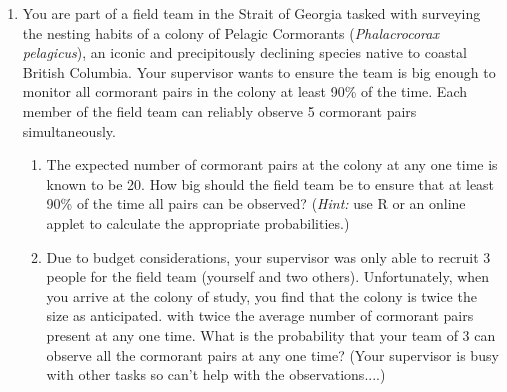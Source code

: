 \documentclass[11pt]{article}
\newcommand{\pr}{\text{Pr}}
\newcommand{\e}{\mathbb{E}}
\begin{document}
\begin{enumerate}[label=\textbf{Q \arabic*:},start=1]
\begin{enumerate}
  \item Now find $\pr(\e(A) - 15 \leq A \leq \e(A) + 15)$ and $\pr(\e(B) - 15 \leq B \leq \e(B) + 15)$. How do the differences in these probabilities compare to the differences in the probabilities you found in part (a)? Do you still prefer one sampling scheme to the other? Why or why not?\\

  \item {\em [Optional bonus question]} Show that as the population size $N$ grows, the probability mass function of a hypergeometric random variable approaches the probability mass function of a binomial random variable, assuming a constant chance of success. That is, show $$\lim_{N\rightarrow\infty} \frac { {m \choose x}{N-m \choose n-x}}{ {N\choose n}} = {n\choose x} p^x (1-p)^{n-x},$$ where $p = \frac mN$ is constant. {\em Hint:} Rewrite the choose functions in terms of factorials and remember that, as we have seen in class, the highest order terms will dominate in the limit.
\end{enumerate}




\vspace*{3mm}

\item You are part of a field team in the Strait of Georgia tasked with surveying the nesting habits of a colony of Pelagic Cormorants ({\em Phalacrocorax pelagicus}), an iconic and precipitously declining species native to coastal British Columbia. Your supervisor wants to ensure the team is big enough to monitor all cormorant pairs in the colony at least 90\% of the time. Each member of the field team can reliably observe 5 cormorant pairs simultaneously. 
\begin{enumerate}
\item The expected number of cormorant pairs at the colony at any one time is known to be 20. How big should the field team be to ensure that at least 90\% of the time all pairs can be observed? 
({\em Hint:} use R or an online applet to calculate the appropriate probabilities.)

\item Due to budget considerations, your supervisor was only able to recruit 3 people for the field team (yourself and two others). Unfortunately, when you arrive at the colony of study, you find that the colony is twice the size as anticipated. with twice the average number of cormorant pairs present at any one time. What is the probability that your team of 3 can observe all the cormorant pairs at any one time? (Your supervisor is busy with other tasks so can't help with the observations....) 
\end{enumerate}




\end{enumerate}
\end{document}
